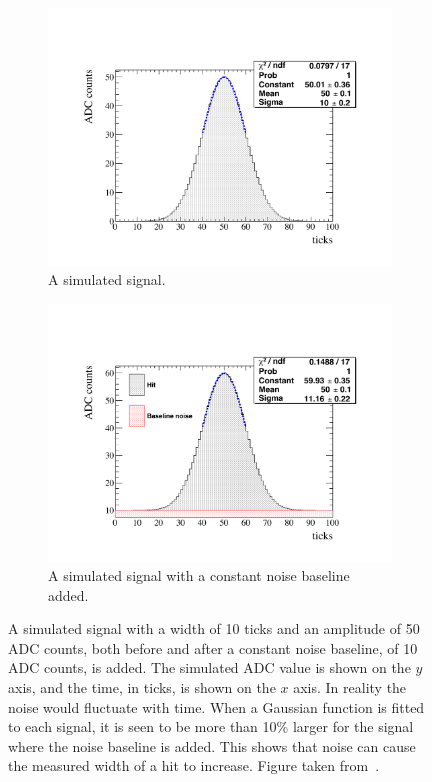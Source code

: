 \begin{figure}[h!]
  \centering
  \begin{subfigure}{0.48\textwidth}
    \centering
    \includegraphics[width=\textwidth]{ToyGauss_Raw}
    \caption{A simulated signal.}
  \end{subfigure}%
  \hspace{0.03\textwidth}%
  \begin{subfigure}{0.48\textwidth}
    \centering
    \includegraphics[width=\textwidth]{ToyGauss_Noise}
    \caption{A simulated signal with a constant noise baseline added.}
  \end{subfigure}
  \caption[The effect of adding a noise baseline to a hit]
          {A simulated signal with a width of 10 ticks and an amplitude of 50 ADC counts, both before and after a constant noise baseline, of 10 ADC counts, is added. The simulated ADC value is shown on the $y$ axis, and the time, in ticks, is shown on the $x$ axis. In reality the noise would fluctuate with time. When a Gaussian function is fitted to each signal, it is seen to be more than 10\% larger for the signal where the noise baseline is added. This shows that noise can cause the measured width of a hit to increase. Figure taken from~\citep{DomSeptMeeting}.}
          \label{fig:DomsHitModel}
\end{figure}  

